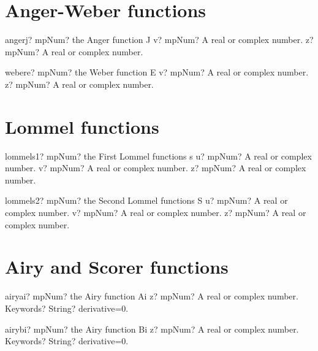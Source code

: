 \documentclass[12pt,a4paper,openany]{book}
\begin{document}
\section{Anger-Weber functions}

\begin{mpFunctionsExtract}
\mpFunctionTwo
{angerj? mpNum? the Anger function J}
{v? mpNum? A real or complex number.}
{z? mpNum? A real or complex number.}
\end{mpFunctionsExtract}

\begin{mpFunctionsExtract}
\mpFunctionTwo
{webere? mpNum? the Weber function E}
{v? mpNum? A real or complex number.}
{z? mpNum? A real or complex number.}
\end{mpFunctionsExtract}

\section{Lommel functions}

\begin{mpFunctionsExtract}
\mpFunctionThree
{lommels1? mpNum? the First Lommel functions s}
{u? mpNum? A real or complex number.}
{v? mpNum? A real or complex number.}
{z? mpNum? A real or complex number.}
\end{mpFunctionsExtract}

\begin{mpFunctionsExtract}
\mpFunctionThree
{lommels2? mpNum? the Second Lommel functions S}
{u? mpNum? A real or complex number.}
{v? mpNum? A real or complex number.}
{z? mpNum? A real or complex number.}
\end{mpFunctionsExtract}

\section{Airy and Scorer functions}

\begin{mpFunctionsExtract}
\mpFunctionTwo
{airyai? mpNum? the Airy function Ai}
{z? mpNum? A real or complex number.}
{Keywords? String? derivative=0.}
\end{mpFunctionsExtract}

\begin{mpFunctionsExtract}
\mpFunctionTwo
{airybi? mpNum? the Airy function Bi}
{z? mpNum? A real or complex number.}
{Keywords? String? derivative=0.}
\end{mpFunctionsExtract}
\end{document}
